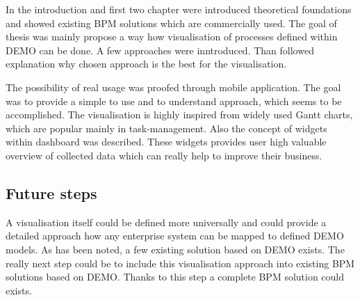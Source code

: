 In the introduction and first two chapter were introduced theoretical foundations and showed existing BPM solutions which are commercially used. The goal of thesis was mainly propose a way how visualisation of processes defined within DEMO can be done. A few approaches were inntroduced. Than followed explanation why chosen approach is the best for the visualisation. 

The possibility of real usage was proofed through mobile application. The goal was to provide a simple to use and to understand approach, which seems to be accomplished. The visualisation is highly inspired from widely used Gantt charts, which are popular mainly in task-management. Also the concept of widgets within dashboard was described. These widgets provides user high valuable overview of collected data which can really help to improve their business. 

\subsection{Future steps}
A visualisation itself could be defined more universally and could provide a detailed approach how any enterprise system can be mapped to defined DEMO models. As has been noted, a few existing solution based on DEMO exists. The really next step could be to include this visualisation  approach into existing BPM solutions based on DEMO. Thanks to this step a complete BPM solution could exists.